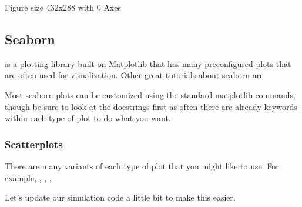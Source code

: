 \documentclass[letterpaper,10pt,english]{sphinxmanual}
\begin{document}
\begin{sphinxVerbatim}[commandchars=\\\{\}]
\PYGZlt{}Figure size 432x288 with 0 Axes\PYGZgt{}
\end{sphinxVerbatim}


\subsection{Seaborn}
\label{\detokenize{content/Introduction_to_Plotting:seaborn}}
 is a plotting library built on Matplotlib that has many pre\sphinxhyphen{}configured plots that are often used for visualization.
Other great tutorials about seaborn are 

Most seaborn plots can be customized using the standard matplotlib commands, though be sure to look at the docstrings first as often there are already keywords within each type of plot to do what you want.


\subsubsection{Scatterplots}
\label{\detokenize{content/Introduction_to_Plotting:scatterplots}}
There are many variants of each type of plot that you might like to use. For example, , , .

Let’s update our simulation code a little bit to make this easier.
\end{document}

